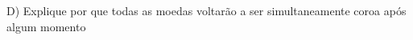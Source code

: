 \documentclass[preview]{standalone}
\begin{document}
\begin{center}
D) Explique por que todas as moedas voltarão a ser simultaneamente coroa após algum momento
\end{center}
\end{document}
